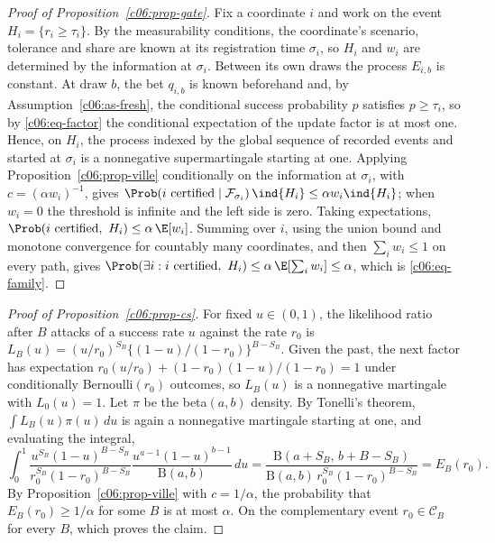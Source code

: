 \begin{proof}[Proof of Proposition~\ref{c06:prop-gate}]
Fix a coordinate $i$ and work on the event $H_i = \{r_i \ge \tau_i\}$. By the
measurability conditions, the coordinate's scenario, tolerance and share are known
at its registration time $\sigma_i$, so $H_i$ and $w_i$ are determined by the
information at $\sigma_i$. Between its own draws the process $E_{i,b}$ is constant.
At draw $b$, the bet $q_{i,b}$ is known beforehand and, by
Assumption~\ref{c06:as-fresh}, the conditional success probability $p$ satisfies
$p \ge \tau_i$, so by \eqref{c06:eq-factor} the conditional expectation of the
update factor is at most one. Hence, on $H_i$, the process indexed by the global
sequence of recorded events and started at $\sigma_i$ is a nonnegative
supermartingale starting at one. Applying Proposition~\ref{c06:prop-ville}
conditionally on the information at $\sigma_i$, with $c = (\alpha w_i)^{-1}$, gives
$\Prob(\text{$i$ certified} \mid \mathcal{F}_{\sigma_i})\,\ind{H_i} \le \alpha w_i
\ind{H_i}$; when $w_i = 0$ the threshold is infinite and the left side is zero. Taking
expectations, $\Prob(\text{$i$ certified},\ H_i) \le \alpha\,\E[w_i]$. Summing over
$i$, using the union bound and monotone convergence for countably many
coordinates, and then $\sum_i w_i \le 1$ on every path, gives
$\Prob(\exists i : \text{$i$ certified},\ H_i) \le \alpha\,\E[\sum_i w_i] \le
\alpha$, which is \eqref{c06:eq-family}.
\end{proof}

\begin{proof}[Proof of Proposition~\ref{c06:prop-cs}]
For fixed $u \in (0,1)$, the likelihood ratio after $B$ attacks of a success rate $u$
against the rate $r_0$ is $L_B(u) = (u/r_0)^{S_B}\{(1-u)/(1-r_0)\}^{B-S_B}$. Given
the past, the next factor has expectation $r_0 (u/r_0) + (1-r_0)(1-u)/(1-r_0) = 1$
under conditionally Bernoulli$(r_0)$ outcomes, so $L_B(u)$ is a nonnegative
martingale with $L_0(u) = 1$. Let $\pi$ be the beta$(a,b)$ density. By Tonelli's
theorem, $\int L_B(u)\pi(u)\,du$ is again a nonnegative martingale starting at one,
and evaluating the integral,
\[
\int_0^1 \frac{u^{S_B}(1-u)^{B-S_B}}{r_0^{S_B}(1-r_0)^{B-S_B}}
\frac{u^{a-1}(1-u)^{b-1}}{\mathrm{B}(a,b)}\,du
= \frac{\mathrm{B}(a+S_B,\, b+B-S_B)}{\mathrm{B}(a,b)\,r_0^{S_B}(1-r_0)^{B-S_B}}
= E_B(r_0) .
\]
By Proposition~\ref{c06:prop-ville} with $c = 1/\alpha$, the probability that
$E_B(r_0) \ge 1/\alpha$ for some $B$ is at most $\alpha$. On the complementary event
$r_0 \in \mathcal{C}_B$ for every $B$, which proves the claim.
\end{proof}

